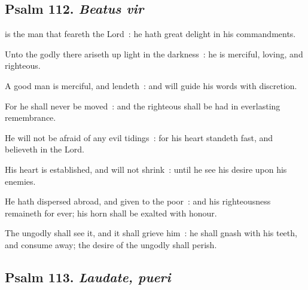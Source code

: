 \vspace{-0.375\baselineskip}

\subsection{Psalm 112. \textit{Beatus vir}}

\vspace{-0.15\baselineskip}

 is the man that feareth the Lord~: he hath great delight in his commandments.\par
{}
Unto the godly there ariseth up light in the darkness~: he is merciful, loving, and righteous.\par
{}A good man is merciful, and lendeth~: and will guide his words with discretion.\par
{}For he shall never be moved~: and the righteous shall be had in everlasting remembrance.\par
{}He will not be afraid of any evil tidings~: for his heart standeth fast, and believeth in the Lord.\par
{}His heart is established, and will not shrink~: until he see his desire upon his enemies.\par
{}He hath dispersed abroad, and given to the poor~: and his righteousness remaineth for ever; his horn shall be exalted with honour.\par
{}The ungodly shall see it, and it shall grieve him~: he shall gnash with his teeth, and consume away; the desire of the ungodly shall perish.\par

\vspace{-0.375\baselineskip}

\subsection{Psalm 113. \textit{Laudate, pueri}}

\vspace{-0.15\baselineskip}


